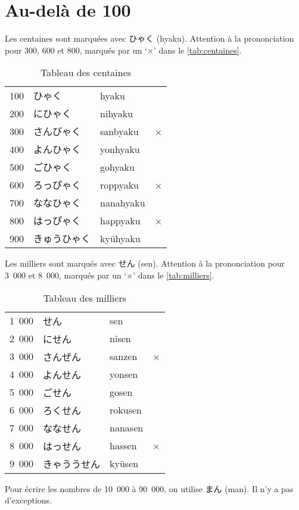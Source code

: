 \documentclass[a4paper,10pt,french,openany]{memoir}
\begin{document}
\section{Au-delà de 100}

Les centaines sont marquées avec ひゃく (hyaku). Attention à la prononciation pour 300, 600 et 800, marqués par un `×' dans le \autoref{tab:centaines}.

\begin{table}[htbp]
 \centering
 \begin{tabular}{clll}
  100 & ひゃく      &hyaku\\
  200 & にひゃく    &nihyaku\\
  300 & さんびゃく   &sanbyaku&×\\
  400 & よんひゃく   &yonhyaku\\
  500 & ごひゃく    &gohyaku\\
  600 & ろっぴゃく   &roppyaku&×\\
  700 & ななひゃく   &nanahyaku\\
  800 & はっぴゃく   &happyaku&×\\
  900 & きゅうひゃく &kyūhyaku\\
 \end{tabular}
 \caption{Tableau des centaines}
 \label{tab:centaines}
\end{table}

Les milliers sont marqués avec せん (sen). Attention à la prononciation pour 3~000 et 8~000, marqués par un `×' dans le \autoref{tab:milliers}.

\begin{table}[htbp]
 \centering
 \begin{tabular}{clll}
  1~000 & せん       &sen\\
  2~000 & にせん      &nisen\\
  3~000 & さんぜん    &sanzen&×\\
  4~000 & よんせん    &yonsen\\
  5~000 & ごせん      &gosen\\
  6~000 & ろくせん    &rokusen\\
  7~000 & ななせん    &nanasen\\
  8~000 & はっせん    &hassen&×\\
  9~000 & きゃううせん &kyūsen\\
 \end{tabular}
 \caption{Tableau des milliers}
 \label{tab:milliers}
\end{table}

Pour écrire les nombres de 10~000 à 90~000, on utilise まん (man). Il n'y a pas d'exceptions.
\end{document}
